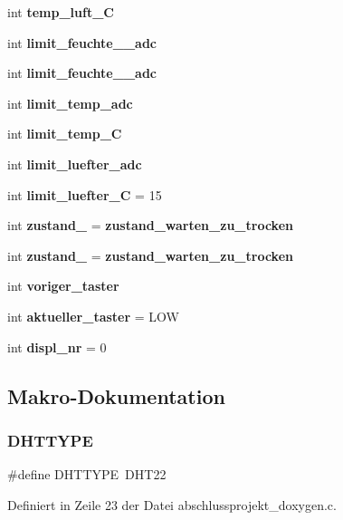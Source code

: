 \begin{DoxyCompactItemize}
int \textbf{ temp\+\_\+luft\+\_\+C}
\item 
int \textbf{ limit\+\_\+feuchte\+\_\+\_\+adc}
\item 
int \textbf{ limit\+\_\+feuchte\+\_\+\_\+adc}
\item 
int \textbf{ limit\+\_\+temp\+\_\+adc}
\item 
int \textbf{ limit\+\_\+temp\+\_\+C}
\item 
int \textbf{ limit\+\_\+luefter\+\_\+adc}
\item 
int \textbf{ limit\+\_\+luefter\+\_\+C} = 15
\item 
int \textbf{ zustand\+\_} = \textbf{ zustand\+\_\+warten\+\_\+zu\+\_\+trocken}
\item 
int \textbf{ zustand\+\_} = \textbf{ zustand\+\_\+warten\+\_\+zu\+\_\+trocken}
\item 
int \textbf{ voriger\+\_\+taster}
\item 
int \textbf{ aktueller\+\_\+taster} = L\+OW
\item 
int \textbf{ displ\+\_\+nr} = 0
\end{DoxyCompactItemize}


\subsection{Makro-\/\+Dokumentation}
\mbox{\label{abschlussprojekt__doxygen_8c_a2c509dba12bba99883a5be9341b7a0c5}} 
\subsubsection{D\+H\+T\+T\+Y\+PE}
{\footnotesize\ttfamily \#define D\+H\+T\+T\+Y\+PE~D\+H\+T22}



Definiert in Zeile 23 der Datei abschlussprojekt\+\_\+doxygen.\+c.

\mbox{\label{abschlussprojekt__doxygen_8c_a217a0b1523cc63a0e9618b0b9bcc3944}} 
